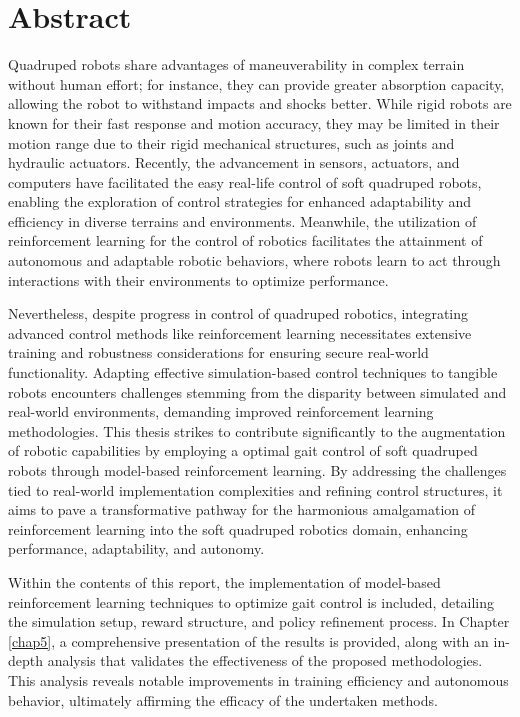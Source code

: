 \chapter*{Abstract}

Quadruped robots share advantages of maneuverability in complex terrain without human effort; for instance, they can provide greater absorption capacity, allowing the robot to withstand impacts and shocks better. While rigid robots are known for their fast response and motion accuracy, they may be limited in their motion range due to their rigid mechanical structures, such as joints and hydraulic actuators. Recently, the advancement in sensors, actuators, and computers have facilitated the easy real-life control of soft quadruped robots, enabling the exploration of control strategies for enhanced adaptability and efficiency in diverse terrains and environments. Meanwhile, the utilization of reinforcement learning for the control of robotics facilitates the attainment of autonomous and adaptable robotic behaviors, where robots learn to act through interactions with their environments to optimize performance. 

Nevertheless, despite progress in control of quadruped robotics, integrating advanced control methods like reinforcement learning necessitates extensive training and robustness considerations for ensuring secure real-world functionality. Adapting effective simulation-based control techniques to tangible robots encounters challenges stemming from the disparity between simulated and real-world environments, demanding improved reinforcement learning methodologies. This thesis strikes to contribute significantly to the augmentation of robotic capabilities by employing a optimal gait control of soft quadruped robots through model-based reinforcement learning. By addressing the challenges tied to real-world implementation complexities and refining control structures, it aims to pave a transformative pathway for the harmonious amalgamation of reinforcement learning into the soft quadruped robotics domain, enhancing performance, adaptability, and autonomy.

Within the contents of this report, the implementation of model-based reinforcement learning techniques to optimize gait control is included, detailing the simulation setup, reward structure, and policy refinement process. In Chapter \ref{chap5}, a comprehensive presentation of the results is provided, along with an in-depth analysis that validates the effectiveness of the proposed methodologies. This analysis reveals notable improvements in training efficiency and autonomous behavior, ultimately affirming the efficacy of the undertaken methods.

